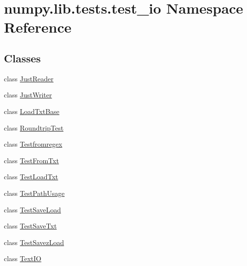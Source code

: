 \hypertarget{namespacenumpy_1_1lib_1_1tests_1_1test__io}{}\section{numpy.\+lib.\+tests.\+test\+\_\+io Namespace Reference}
\label{namespacenumpy_1_1lib_1_1tests_1_1test__io}
\subsection*{Classes}
\begin{DoxyCompactItemize}
\item 
class \hyperlink{classnumpy_1_1lib_1_1tests_1_1test__io_1_1JustReader}{Just\+Reader}
\item 
class \hyperlink{classnumpy_1_1lib_1_1tests_1_1test__io_1_1JustWriter}{Just\+Writer}
\item 
class \hyperlink{classnumpy_1_1lib_1_1tests_1_1test__io_1_1LoadTxtBase}{Load\+Txt\+Base}
\item 
class \hyperlink{classnumpy_1_1lib_1_1tests_1_1test__io_1_1RoundtripTest}{Roundtrip\+Test}
\item 
class \hyperlink{classnumpy_1_1lib_1_1tests_1_1test__io_1_1Testfromregex}{Testfromregex}
\item 
class \hyperlink{classnumpy_1_1lib_1_1tests_1_1test__io_1_1TestFromTxt}{Test\+From\+Txt}
\item 
class \hyperlink{classnumpy_1_1lib_1_1tests_1_1test__io_1_1TestLoadTxt}{Test\+Load\+Txt}
\item 
class \hyperlink{classnumpy_1_1lib_1_1tests_1_1test__io_1_1TestPathUsage}{Test\+Path\+Usage}
\item 
class \hyperlink{classnumpy_1_1lib_1_1tests_1_1test__io_1_1TestSaveLoad}{Test\+Save\+Load}
\item 
class \hyperlink{classnumpy_1_1lib_1_1tests_1_1test__io_1_1TestSaveTxt}{Test\+Save\+Txt}
\item 
class \hyperlink{classnumpy_1_1lib_1_1tests_1_1test__io_1_1TestSavezLoad}{Test\+Savez\+Load}
\item 
class \hyperlink{classnumpy_1_1lib_1_1tests_1_1test__io_1_1TextIO}{Text\+IO}
\end{DoxyCompactItemize}
